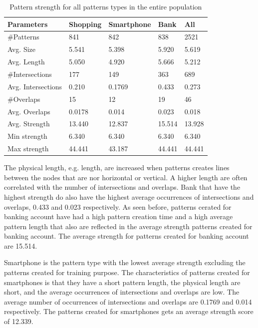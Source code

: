    \begin{table}[H]
    \centering
      \begin{tabular}{l || l | l | l || l}
        \hline
        {\bf Parameters} & {\bf Shopping} & {\bf Smartphone} & {\bf Bank} & {\bf All} \\ \hline
        \#Patterns & 841 & 842 & 838                  & 2521 \\
        Avg. Size & 5.541 & 5.398 & 5.920             & 5.619 \\ 
        Avg. Length & 5.050 & 4.920 & 5.666           & 5.212 \\
        \#Intersections & 177 & 149 & 363             & 689 \\
        Avg. Intersections & 0.210 & 0.1769 & 0.433   & 0.273 \\
        \#Overlaps & 15 & 12 & 19                     & 46 \\
        Avg. Overlaps & 0.0178 & 0.014 & 0.023        & 0.018 \\ \hline
        Avg. Strength & 13.440 & 12.837 & 15.514      & 13.928 \\ 
        Min strength & 6.340 & 6.340 & 6.340          & 6.340 \\
        Max strength & 44.441 & 43.187 & 44.441       & 44.441 \\ \hline
      \end{tabular}
      \caption{Pattern strength for all patterns types in the entire population}
      \label{tab:patternstrength}
    \end{table}

    The physical length, e.g. length, are increased when patterns creates lines between the nodes that are nor horizontal or vertical. A higher length are often correlated with the number of intersections and overlaps. Bank that have the highest strength do also have the highest average occurrences of intersections and overlaps, 0.433 and 0.023 respectively. 
    As seen before, patterns cerated for banking account have had a high pattern creation time and a high average pattern length that also are reflected in the average strength patterns created for banking account. The average strength for patterns created for banking account are 15.514.

    Smartphone is the pattern type with the lowest average strength excluding the patterns created for training purpose. The characteristics of patterns created for smartphones is that they have a short pattern length, the physical length are short, and the average occurrences of intersections and overlaps are low. The average number of occurrences of intersections and overlaps are 0.1769 and 0.014 respectively. The patterns created for smartphones gets an average strength score of 12.339. 

